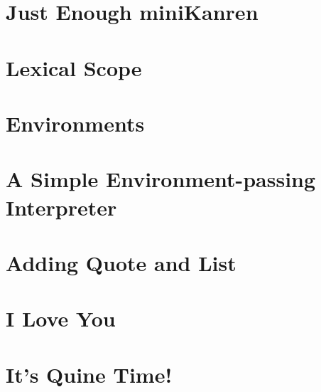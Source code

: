 \documentclass[11pt]{book}
\begin{document}
\begin{schemeregion}
\chapter{Just Enough miniKanren}


\chapter{Lexical Scope}






\chapter{Environments}

\chapter{A Simple Environment-passing Interpreter}

\chapter{Adding Quote and List}

\chapter{I Love You}

\chapter{It's Quine Time!}






\backmatter




%


\printindex %

\end{schemeregion}
\end{document}
